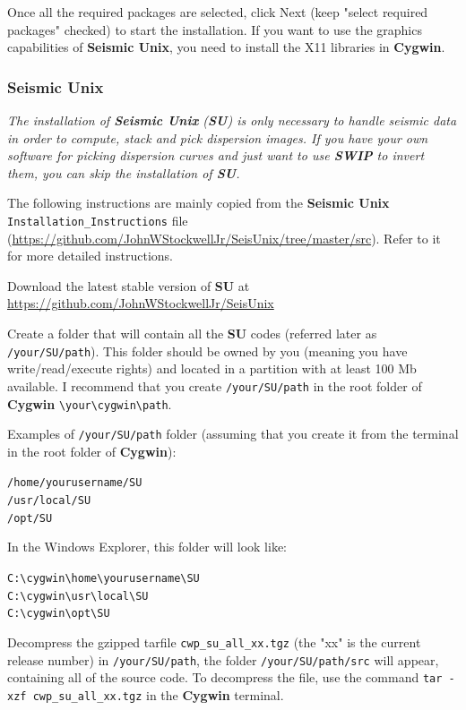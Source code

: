 \documentclass[twoside,a4paper]{article}
\def\SWIP{\textbf{SWIP}}
\def\SU{\textbf{SU}}
\def\SeismicUnix{\textbf{Seismic Unix}}
\def\Cygwin{\textbf{Cygwin}}
\begin{document}
Once all the required packages are selected, click Next (keep "select required packages" checked) to start the installation. If you want to use the graphics capabilities of {\SeismicUnix}, you need to install the X11 libraries in {\Cygwin}.

\subsubsection{Seismic Unix}
\label{subsec:WinSU}
\textit{The installation of {\SeismicUnix} ({\SU}) is only necessary to handle seismic data in order to compute, stack and pick dispersion images. If you have your own software for picking dispersion curves and just want to use {\SWIP} to invert them, you can skip the installation of {\SU}.}

The following instructions are mainly copied from the {\SeismicUnix} \verb|Installation_Instructions| file (\url{https://github.com/JohnWStockwellJr/SeisUnix/tree/master/src}). Refer to it for more detailed instructions.

Download the latest stable version of {\SU} at \url{https://github.com/JohnWStockwellJr/SeisUnix}

Create a folder that will contain all the {\SU} codes (referred later as \verb|/your/SU/path|). This folder should be owned by you (meaning you have write/read/execute rights) and located in a partition with at least 100 Mb available. I recommend that you create \verb|/your/SU/path| in the root folder of {\Cygwin} \verb|\your\cygwin\path|.

Examples of \verb|/your/SU/path| folder (assuming that you create it from the terminal in the root folder of {\Cygwin}):

\verb|/home/yourusername/SU|\\
\verb|/usr/local/SU|\\
\verb|/opt/SU|

In the Windows Explorer, this folder will look like:

\verb|C:\cygwin\home\yourusername\SU|\\
\verb|C:\cygwin\usr\local\SU|\\
\verb|C:\cygwin\opt\SU|

Decompress the gzipped tarfile \verb|cwp_su_all_xx.tgz| (the "xx" is the current release number) in \verb|/your/SU/path|, the folder \verb|/your/SU/path/src| will appear, containing all of the source code. To decompress the file, use the command \verb|tar -xzf cwp_su_all_xx.tgz| in the {\Cygwin} terminal.
\end{document}

